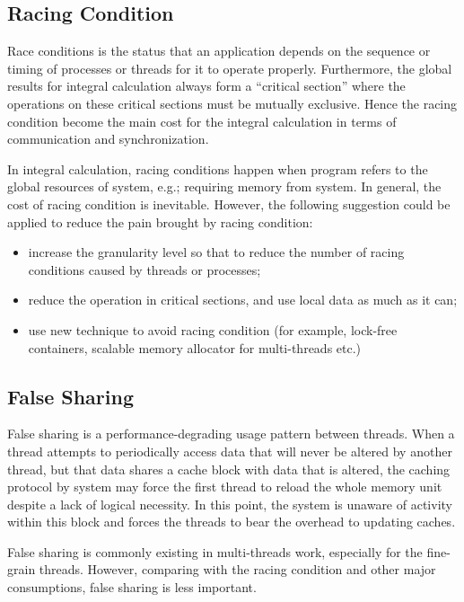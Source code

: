 \subsection{Racing Condition}
%
%
Race conditions is the status that an application depends on the sequence or timing 
of processes or threads for it to operate properly. Furthermore, the global results for 
integral calculation always form a ``critical section'' where the operations on these 
critical sections must be mutually exclusive. Hence the racing condition become 
the main cost for the integral calculation in terms of communication and synchronization.

In integral calculation, racing conditions happen when program refers to the global
resources of system, e.g.; requiring memory from system. In general, the cost of 
racing condition is inevitable. However, the following suggestion could be applied to 
reduce the pain brought by racing condition:
\begin{itemize}
 \item increase the granularity level so that to reduce the number of racing conditions
 caused by threads or processes;
 \item reduce the operation in critical sections, and use local data as much as it can;
 \item use new technique to avoid racing condition (for example, lock-free containers,
	 scalable memory allocator for multi-threads etc.)
\end{itemize}

\subsection{False Sharing}
%
%
\label{false_allocation_parallel_int}
False sharing is a performance-degrading usage pattern between threads. When a thread 
attempts to periodically access data that will never be altered by another thread, but that data 
shares a cache block with data that is altered, the caching protocol by system may force the 
first thread to reload the whole memory unit despite a lack of logical necessity. In this point,
the system is unaware of activity within this block and forces the threads to bear the overhead 
to updating caches.

False sharing is commonly existing in multi-threads work, especially for the fine-grain threads.
However, comparing with the racing condition and other major consumptions, false sharing 
is less important. 


